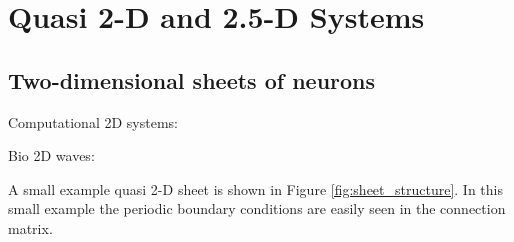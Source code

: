 
\chapter{Quasi 2-D and 2.5-D Systems}

\section{Two-dimensional sheets of neurons}
Computational 2D systems: \citet{keane2015}\citet{Spreizer2019}

Bio 2D waves: \citet{huang2004}\citet{Townsend2018}

A small example quasi 2-D sheet is shown in Figure \ref{fig:sheet_structure}.
In this small example the periodic boundary conditions are easily seen in the connection matrix.

